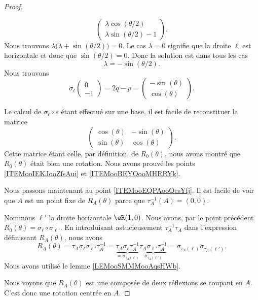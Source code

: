 \begin{proof}
\begin{subproof}
\begin{equation}
\begin{pmatrix}
				\lambda\cos(\theta/2) \\
				\lambda\sin(\theta/2)-1
			\end{pmatrix}.
		\end{equation}
		Nous trouvons \( \lambda\big( \lambda+\sin(\theta/2) \big)=0\). Le cas \( \lambda=0\) signifie que la droite \( \ell\) est horizontale et donc que \( \sin(\theta/2)=0\). Donc la solution est dans tous les cas
		\begin{equation}
			\lambda=-\sin(\theta/2).
		\end{equation}
		Nous trouvons
		\begin{equation}
			\sigma_{\ell}\begin{pmatrix}
				0 \\
				-1
			\end{pmatrix}=2q-p=\begin{pmatrix}
				-\sin(\theta) \\
				\cos(\theta)
			\end{pmatrix}.
		\end{equation}
	\end{subproof}
	Le calcul de \( \sigma_{\ell}\circ s\) étant effectué sur une base, il est facile de reconstituer la matrice
	\begin{equation}
		\begin{pmatrix}
			\cos(\theta) & -\sin(\theta) \\
			\sin(\theta) & \cos(\theta)
		\end{pmatrix}.
	\end{equation}
	Cette matrice étant celle, par définition, de \( R_0(\theta)\), nous avons montré que \( R_0(\theta)\) était bien une rotation. Nous avons prouvé les points \ref{ITEMooIEKJooZfsAui} et \ref{ITEMooBEYOooMHRRYk}.

	Nous passons maintenant au point \ref{ITEMooEQPAooQcsYfj}. Il est facile de voir que \( A\) est un point fixe de \( R_{A}(\theta)\) parce que \( \tau_A^{-1}(A)=(0,0)\).

	Nommons \( \ell'\) la droite horizontale \( \eR(1,0)\). Nous avons, par le point précédent \( R_0(\theta)=\sigma_{\ell}\circ \sigma_{\ell'}\). En introduisant astucieusement \( \tau_A^{-1}\tau_A\) dans l'expression définissant \( R_A(\theta)\), nous avons
	\begin{equation}
		R_A(\theta)=\tau_A\sigma_{\ell}\sigma_{\ell'}\tau_A^{-1}=\underbrace{\tau_A\sigma_{\ell}\tau_A^{-1}}_{=\sigma_{\tau_A(\ell)}}\underbrace{\tau_A\sigma_{\ell'}\tau_A^{-1}}_{\sigma_{\tau_A(\ell')}}=\sigma_{\tau_A(\ell)}\sigma_{\tau_A(\ell')}.
	\end{equation}
	Nous avons utilisé le lemme \ref{LEMooSMMMooAqsHWb}.

	Nous voyons que \( R_A(\theta)\) est une composée de deux réflexions se coupant en \( A\). C'est donc une rotation centrée en \( A\).


\end{proof}

